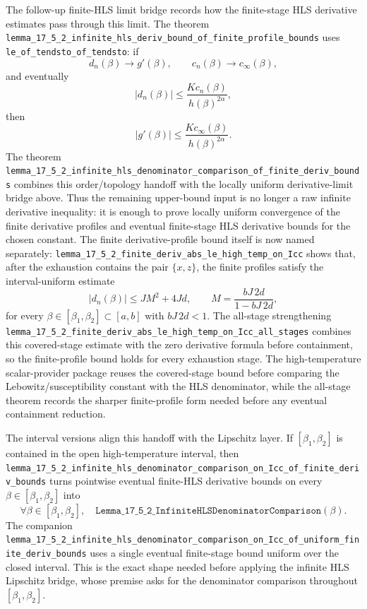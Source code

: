 \documentclass[a4paper,11pt]{article}
\begin{document}
The follow-up finite-HLS limit bridge records how the finite-stage HLS
derivative estimates pass through this limit.  The theorem
\texttt{lemma\_17\_5\_2\_infinite\_hls\_deriv\_bound\_of\_finite\_profile\_bounds}
uses \texttt{le\_of\_tendsto\_of\_tendsto}: if
\[
  d_n(\beta)\to g'(\beta),\qquad c_n(\beta)\to c_\infty(\beta),
\]
and eventually
\[
  |d_n(\beta)|\le \frac{Kc_n(\beta)}{h(\beta)^{2\alpha}},
\]
then
\[
  |g'(\beta)|\le \frac{Kc_\infty(\beta)}{h(\beta)^{2\alpha}}.
\]
The theorem
\texttt{lemma\_17\_5\_2\_infinite\_hls\_denominator\_comparison\_of\_finite\_deriv\_bounds}
combines this order/topology handoff with the locally uniform derivative-limit
bridge above.  Thus the remaining upper-bound input is no longer a raw
infinite derivative inequality: it is enough to prove locally uniform
convergence of the finite derivative profiles and eventual finite-stage HLS
derivative bounds for the chosen constant.
The finite derivative-profile bound itself is now named separately:
\texttt{lemma\_17\_5\_2\_finite\_deriv\_abs\_le\_high\_temp\_on\_Icc}
shows that, after the exhaustion contains the pair \(\{x,z\}\), the finite
profiles satisfy the interval-uniform estimate
\[
  |d_n(\beta)| \le J M^2 + 4Jd,\qquad
  M=\frac{bJ\,2d}{1-bJ\,2d},
\]
for every \(\beta\in[\beta_1,\beta_2]\subset[a,b]\) with \(bJ\,2d<1\).
The all-stage strengthening
\texttt{lemma\_17\_5\_2\_finite\_deriv\_abs\_le\_high\_temp\_on\_Icc\_all\_stages}
combines this covered-stage estimate with the zero derivative formula before
containment, so the finite-profile bound holds for every exhaustion stage.
The high-temperature scalar-provider package reuses the covered-stage bound
before comparing the Lebowitz/susceptibility constant with the HLS
denominator, while the all-stage theorem records the sharper finite-profile
form needed before any eventual containment reduction.

The interval versions align this handoff with the Lipschitz layer.  If
\([\beta_1,\beta_2]\) is contained in the open high-temperature interval, then
\texttt{lemma\_17\_5\_2\_infinite\_hls\_denominator\_comparison\_on\_Icc\_of\_finite\_deriv\_bounds}
turns pointwise eventual finite-HLS derivative bounds on every
\(\beta\in[\beta_1,\beta_2]\) into
\[
  \forall\beta\in[\beta_1,\beta_2],\quad
  \texttt{Lemma\_17\_5\_2\_InfiniteHLSDenominatorComparison}(\beta).
\]
The companion
\texttt{lemma\_17\_5\_2\_infinite\_hls\_denominator\_comparison\_on\_Icc\_of\_uniform\_finite\_deriv\_bounds}
uses a single eventual finite-stage bound uniform over the closed interval.
This is the exact shape needed before applying the infinite HLS Lipschitz
bridge, whose premise asks for the denominator comparison throughout
\([\beta_1,\beta_2]\).
\end{document}
